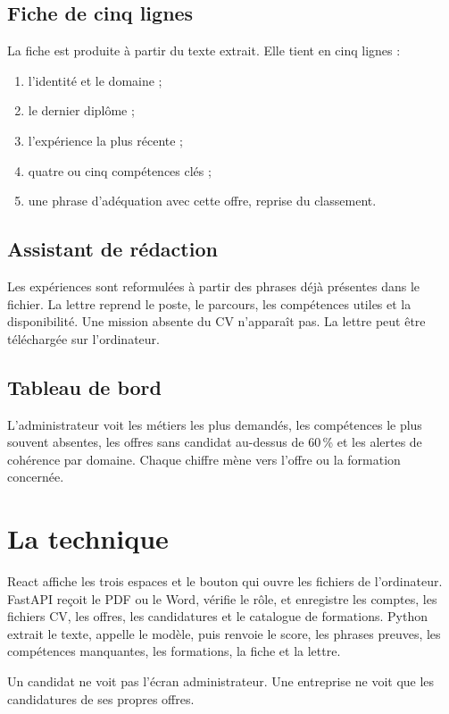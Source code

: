 \documentclass[11pt,a4paper]{article}
\begin{document}
\subsection{Fiche de cinq lignes}
La fiche est produite à partir du texte extrait. Elle tient en cinq lignes :
\begin{enumerate}
  \item l'identité et le domaine ;
  \item le dernier diplôme ;
  \item l'expérience la plus récente ;
  \item quatre ou cinq compétences clés ;
  \item une phrase d'adéquation avec cette offre, reprise du classement.
\end{enumerate}

\subsection{Assistant de rédaction}
Les expériences sont reformulées à partir des phrases déjà présentes dans le fichier. La lettre reprend le poste, le parcours, les compétences utiles et la disponibilité. Une mission absente du CV n'apparaît pas. La lettre peut être téléchargée sur l'ordinateur.

\subsection{Tableau de bord}
L'administrateur voit les métiers les plus demandés, les compétences le plus souvent absentes, les offres sans candidat au-dessus de 60\,\% et les alertes de cohérence par domaine. Chaque chiffre mène vers l'offre ou la formation concernée.

\section{La technique}

React affiche les trois espaces et le bouton qui ouvre les fichiers de l'ordinateur. FastAPI reçoit le PDF ou le Word, vérifie le rôle, et enregistre les comptes, les fichiers CV, les offres, les candidatures et le catalogue de formations. Python extrait le texte, appelle le modèle, puis renvoie le score, les phrases preuves, les compétences manquantes, les formations, la fiche et la lettre.

Un candidat ne voit pas l'écran administrateur. Une entreprise ne voit que les candidatures de ses propres offres.
\end{document}
